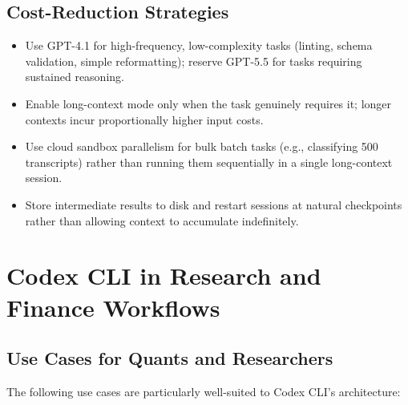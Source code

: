 \subsection{Cost-Reduction Strategies}
\label{app:codex:cost-reduction}

\begin{itemize}
  \item Use GPT-4.1 for high-frequency, low-complexity tasks (linting, schema
        validation, simple reformatting); reserve GPT-5.5 for tasks requiring
        sustained reasoning.
  \item Enable long-context mode only when the task genuinely requires it;
        longer contexts incur proportionally higher input costs.
  \item Use cloud sandbox parallelism for bulk batch tasks (e.g., classifying
        500 transcripts) rather than running them sequentially in a single
        long-context session.
  \item Store intermediate results to disk and restart sessions at natural
        checkpoints rather than allowing context to accumulate indefinitely.
\end{itemize}

\section{Codex CLI in Research and Finance Workflows}
\label{app:codex:finance}

\subsection{Use Cases for Quants and Researchers}
\label{app:codex:use-cases}

The following use cases are particularly well-suited to Codex CLI's
architecture:

